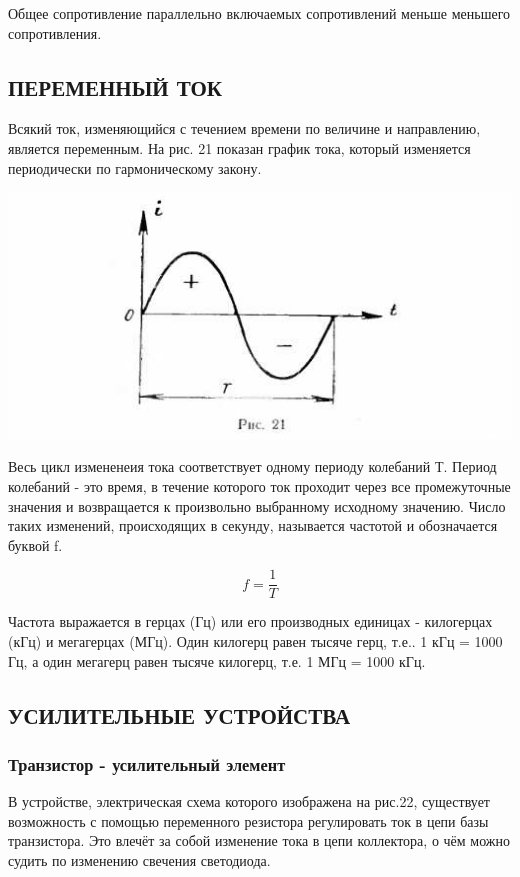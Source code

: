 \documentclass[12pt]{article}
\begin{document}
Общее сопротивление параллельно включаемых сопротивлений меньше меньшего сопротивления.

\subsection{ПЕРЕМЕННЫЙ ТОК}

Всякий ток, изменяющийся с течением времени по величине и направлению, является переменным.
\newpage
На рис. 21 показан график тока, который изменяется периодически по гармоническому закону.

\includegraphics[width=\textwidth]{ekon3_018_1}

Весь цикл измененеия тока соответствует одному периоду колебаний Т. Период колебаний - это время, в течение которого ток проходит через все промежуточные значения и возвращается к произвольно выбранному исходному значению. Число таких изменений, происходящих в секунду, называется частотой и обозначается буквой f.

\begin{equation}
f = \frac{1}{T}
\end{equation}

Частота выражается в герцах (Гц) или его производных единицах - килогерцах (кГц) и мегагерцах (МГц). Один килогерц равен тысяче герц, т.е.. 1 кГц = 1000 Гц, а один мегагерц равен тысяче килогерц, т.е. 1 МГц = 1000 кГц.

\subsection{УСИЛИТЕЛЬНЫЕ УСТРОЙСТВА}
\subsubsection{Транзистор - усилительный элемент}

В устройстве, электрическая схема которого изображена на рис.22, существует возможность с помощью переменного резистора регулировать ток в цепи базы транзистора. Это влечёт за собой изменение тока в цепи коллектора, о чём можно судить по изменению свечения светодиода.
\newpage
\end{document}
